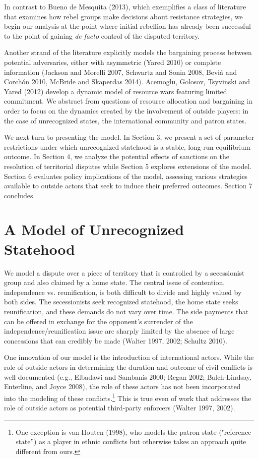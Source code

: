 \documentclass[11pt,letterpaper, notitlepage]{article}
\begin{document}
In contrast to Bueno de Mesquita (2013), which exemplifies a class of literature that examines how rebel groups make decisions about resistance strategies, we begin our analysis at the point where initial rebellion has already been successful to the point of gaining \textit{de facto} control of the disputed territory.

Another strand of the literature explicitly models the bargaining process between potential adversaries, either with asymmetric (Yared 2010) or complete information (Jackson and Morelli 2007, Schwartz and Sonin 2008, Bevi\'{a} and Corch\'{o}n 2010, McBride and Skaperdas 2014). Acemoglu, Golosov, Tsyvinski and Yared (2012) develop a dynamic model of resource wars featuring limited commitment. We abstract from questions of resource allocation and bargaining in order to focus on the dynamics created by the involvement of outside players: in the case of unrecognized states, the international community and patron states.

We next turn to presenting the model. In Section 3, we present a set of parameter restrictions under which unrecognized statehood is a stable, long-run equilibrium outcome. In Section 4, we analyze the potential effects of sanctions on the resolution of territorial disputes while Section 5 explores extensions of the model. Section 6 evaluates policy implications of the model, assessing various strategies available to outside actors that seek to induce their preferred outcomes. Section 7 concludes.


\section{A Model of Unrecognized Statehood} 
We model a dispute over a piece of territory that is controlled by a secessionist group and also claimed by a home state. The central issue of contention, independence vs. reunification, is both difficult to divide and highly valued by both sides. The secessionists seek recognized statehood, the home state seeks reunification, and these demands do not vary over time. The side payments that can be offered in exchange for the opponent's surrender of the independence/reunification issue are sharply limited by the absence of large concessions that can credibly be made (Walter 1997, 2002; Schultz 2010).

One innovation of our model is the introduction of international actors. While the role of outside actors in determining the duration and outcome of civil conflicts is well documented (e.g., Elbadawi and Sambanis 2000; Regan 2002; Balch-Lindsay, Enterline, and Joyce 2008), the role of these actors has not been incorporated into the modeling of these conflicts.\footnote{One exception is van Houten (1998), who models the patron state ("reference state'') as a player in ethnic conflicts but otherwise takes an approach quite different from ours.} This is true even of work that addresses the role of outside actors as potential third-party enforcers (Walter 1997, 2002).
\end{document}
